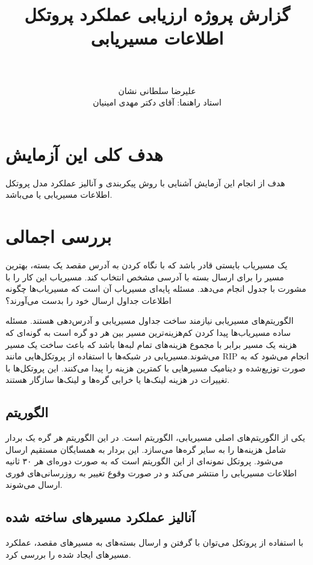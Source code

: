 \documentclass[a4paper]{article}
\title{گزارش پروژه ارزیابی عملکرد پروتکل اطلاعات مسیریابی \\ \lr{RIP: Routing
Information Protocol} \\ \small{\lr{A Routing Protocol Based on the
Distance-Vector Algorithm}}}
\author{علیرضا سلطانی نشان \\ \small{استاد راهنما: آقای دکتر مهدی امینیان}}
\begin{document}
\maketitle
\tableofcontents
\listoffigures

\section{هدف کلی این آزمایش}

هدف از انجام این آزمایش آشنایی با روش پیکربندی و آنالیز عملکرد مدل پروتکل
اطلاعات مسیریابی یا  می‌باشد.

\section{بررسی اجمالی}

یک مسیریاب بایستی قادر باشد که با نگاه کردن به آدرس مقصد یک بسته، بهترین مسیر را
برای ارسال بسته با آدرسی مشخص انتخاب کند. مسیریاب این کار را با مشورت با جدول
 انجام می‌دهد. مسئله پایه‌ای مسیریاب آن است که مسیریاب‌ها چگونه
اطلاعات جداول ارسال خود را بدست می‌آورند؟

الگوریتم‌های مسیریابی نیازمند ساخت جداول مسیریابی و آدرس‌دهی هستند. مسئله ساده
مسیریاب‌ها پیدا کردن کم‌هزینه‌ترین مسیر بین هر دو گره است به گونه‌ای که هزینه یک
مسیر برابر با مجموع هزینه‌های تمام لبه‌ها باشد که باعث ساخت یک مسیر
می‌شوند.مسیریابی در شبکه‌ها با استفاده از پروتکل‌هایی مانند RIP انجام می‌شود که
به صورت توزیع‌شده و دینامیک مسیرهایی با کمترین هزینه را پیدا می‌کنند. این
پروتکل‌ها با تغییرات در هزینه لینک‌ها یا خرابی گره‌ها و لینک‌ها سازگار هستند. 

\subsection{الگوریتم }

یکی از الگوریتم‌های اصلی مسیریابی، الگوریتم  است. در این
الگوریتم هر گره یک بردار شامل هزینه‌ها را به سایر گره‌ها می‌سازد. این بردار به
همسایگان مستقیم ارسال می‌شود. پروتکل  نمونه‌ای از این الگوریتم است که به
صورت دوره‌ای هر ۳۰ ثانیه اطلاعات مسیریابی را منتشر  می‌کند  و
در صورت وقوع تغییر  به روزرسانی‌های فوری ارسال می‌شوند.

\subsection{آنالیز عملکرد مسیر‌های ساخته شده}

با استفاده از پروتکل  می‌توان با  گرفتن و ارسال بسته‌های
 به مسیر‌های مقصد، عملکرد مسیر‌های ایجاد شده را بررسی کرد.
\end{document}
